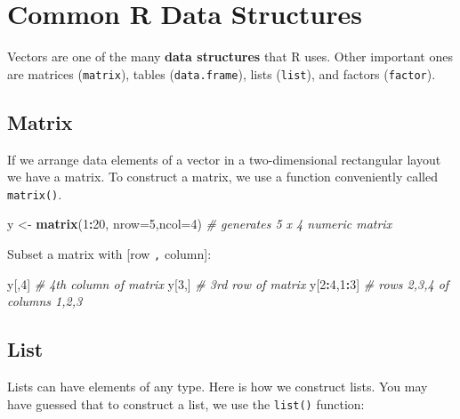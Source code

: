 \documentclass[
]{book}
\newenvironment{Shaded}{\begin{snugshade}}{\end{snugshade}}
\newcommand{\AttributeTok}[1]{\textcolor[rgb]{0.13,0.29,0.53}{#1}}
\newcommand{\CommentTok}[1]{\textcolor[rgb]{0.56,0.35,0.01}{\textit{#1}}}
\newcommand{\DecValTok}[1]{\textcolor[rgb]{0.00,0.00,0.81}{#1}}
\newcommand{\FunctionTok}[1]{\textcolor[rgb]{0.13,0.29,0.53}{\textbf{#1}}}
\newcommand{\NormalTok}[1]{#1}
\newcommand{\OtherTok}[1]{\textcolor[rgb]{0.56,0.35,0.01}{#1}}
\newcommand{\SpecialCharTok}[1]{\textcolor[rgb]{0.81,0.36,0.00}{\textbf{#1}}}
\begin{document}
\section{Common R Data Structures}\label{common-r-data-structures}

Vectors are one of the many \textbf{data structures} that R uses. Other important
ones are matrices (\texttt{matrix}), tables (\texttt{data.frame}), lists (\texttt{list}), and
factors (\texttt{factor}).

\subsection{Matrix}\label{matrix}

If we arrange data elements of a vector in a two-dimensional rectangular layout we have a matrix. To construct a matrix, we use a function conveniently called \texttt{matrix()}.

\begin{Shaded}
\begin{Highlighting}[]
\NormalTok{y }\OtherTok{\textless{}{-}} \FunctionTok{matrix}\NormalTok{(}\DecValTok{1}\SpecialCharTok{:}\DecValTok{20}\NormalTok{, }\AttributeTok{nrow=}\DecValTok{5}\NormalTok{,}\AttributeTok{ncol=}\DecValTok{4}\NormalTok{) }\CommentTok{\# generates 5 x 4 numeric matrix}
\end{Highlighting}
\end{Shaded}

Subset a matrix with {[}row \texttt{,} column{]}:

\begin{Shaded}
\begin{Highlighting}[]
\NormalTok{y[,}\DecValTok{4}\NormalTok{]       }\CommentTok{\# 4th column of matrix}
\NormalTok{y[}\DecValTok{3}\NormalTok{,]       }\CommentTok{\# 3rd row of matrix}
\NormalTok{y[}\DecValTok{2}\SpecialCharTok{:}\DecValTok{4}\NormalTok{,}\DecValTok{1}\SpecialCharTok{:}\DecValTok{3}\NormalTok{]  }\CommentTok{\# rows 2,3,4 of columns 1,2,3}
\end{Highlighting}
\end{Shaded}

\subsection{List}\label{list}

Lists can have elements of any type. Here is how we construct lists. You may have guessed that to construct a list, we use the \texttt{list()} function:
\end{document}
